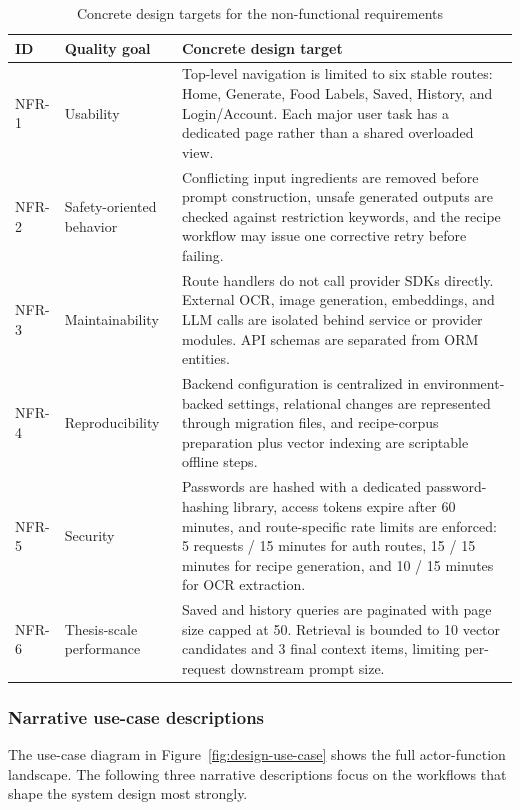 \begin{table}[H]
	\centering
	\scriptsize
	\begin{tabular}{|p{1.4cm}|p{5.7cm}|p{7.2cm}|}
		\hline
		\textbf{ID} & \textbf{Quality goal} & \textbf{Concrete design target} \\
		\hline
		NFR-1 & Usability & Top-level navigation is limited to six stable routes: Home, Generate, Food Labels, Saved, History, and Login/Account. Each major user task has a dedicated page rather than a shared overloaded view. \\
		\hline
		NFR-2 & Safety-oriented behavior & Conflicting input ingredients are removed before prompt construction, unsafe generated outputs are checked against restriction keywords, and the recipe workflow may issue one corrective retry before failing. \\
		\hline
		NFR-3 & Maintainability & Route handlers do not call provider SDKs directly. External OCR, image generation, embeddings, and LLM calls are isolated behind service or provider modules. API schemas are separated from ORM entities. \\
		\hline
		NFR-4 & Reproducibility & Backend configuration is centralized in environment-backed settings, relational changes are represented through migration files, and recipe-corpus preparation plus vector indexing are scriptable offline steps. \\
		\hline
		NFR-5 & Security & Passwords are hashed with a dedicated password-hashing library, access tokens expire after 60 minutes, and route-specific rate limits are enforced: 5 requests / 15 minutes for auth routes, 15 / 15 minutes for recipe generation, and 10 / 15 minutes for OCR extraction. \\
		\hline
		NFR-6 & Thesis-scale performance & Saved and history queries are paginated with page size capped at 50. Retrieval is bounded to 10 vector candidates and 3 final context items, limiting per-request downstream prompt size. \\
		\hline
	\end{tabular}
	\caption{Concrete design targets for the non-functional requirements}
	\label{tab:design-nfr-criteria}
\end{table}

\subsubsection{Narrative use-case descriptions}

The use-case diagram in Figure~\ref{fig:design-use-case} shows the full
actor-function landscape. The following three narrative descriptions
focus on the workflows that shape the system design most strongly.

